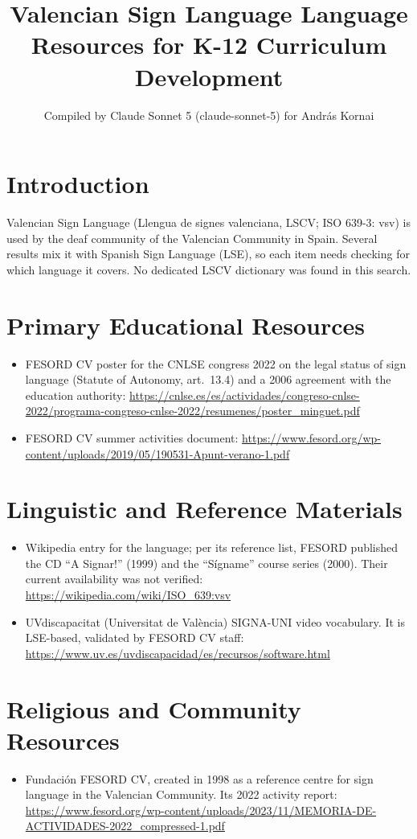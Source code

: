 \documentclass[12pt]{article}
\title{Valencian Sign Language Language Resources for K-12 Curriculum Development}
\author{Compiled by Claude Sonnet 5 (claude-sonnet-5) for Andr\'as Kornai}
\date{}
\begin{document}
\maketitle

\section{Introduction}
Valencian Sign Language (Llengua de signes valenciana, LSCV; ISO 639-3: vsv) is used by the deaf community of the Valencian Community in Spain. Several results mix it with Spanish Sign Language (LSE), so each item needs checking for which language it covers. No dedicated LSCV dictionary was found in this search.

\section{Primary Educational Resources}
\begin{itemize}
\item FESORD CV poster for the CNLSE congress 2022 on the legal status of sign language (Statute of Autonomy, art.\ 13.4) and a 2006 agreement with the education authority: \url{https://cnlse.es/es/actividades/congreso-cnlse-2022/programa-congreso-cnlse-2022/resumenes/poster_minguet.pdf}
\item FESORD CV summer activities document: \url{https://www.fesord.org/wp-content/uploads/2019/05/190531-Apunt-verano-1.pdf}
\end{itemize}

\section{Linguistic and Reference Materials}
\begin{itemize}
\item Wikipedia entry for the language; per its reference list, FESORD published the CD ``\textexclamdown A Signar!'' (1999) and the ``S\'igname'' course series (2000). Their current availability was not verified: \url{https://wikipedia.com/wiki/ISO_639:vsv}
\item UVdiscapacitat (Universitat de Val\`encia) SIGNA-UNI video vocabulary. It is LSE-based, validated by FESORD CV staff: \url{https://www.uv.es/uvdiscapacidad/es/recursos/software.html}
\end{itemize}

\section{Religious and Community Resources}
\begin{itemize}
\item Fundaci\'on FESORD CV, created in 1998 as a reference centre for sign language in the Valencian Community. Its 2022 activity report: \url{https://www.fesord.org/wp-content/uploads/2023/11/MEMORIA-DE-ACTIVIDADES-2022_compressed-1.pdf}
\end{itemize}
\end{document}
